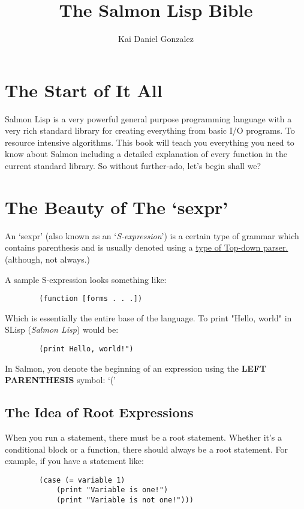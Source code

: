 \documentclass{article}
\title{The Salmon Lisp Bible}
\author{Kai Daniel Gonzalez}
\begin{document}
	\maketitle
	\tableofcontents
	\section{The Start of It All}
	Salmon Lisp is a very powerful general purpose programming language with a
	very rich standard library for creating everything from basic I/O programs. To resource intensive algorithms.
	\newline
	\newline
	This book will teach you everything you need to know about Salmon including a detailed explanation of every function in the current standard library. So without further-ado, let's begin shall we?
	\section{The Beauty of The `sexpr'}
	An `sexpr' (also known as an `\emph{S-expression}') is a certain type of grammar which
	contains parenthesis and is usually denoted using a \href{https://en.wikipedia.org/wiki/Top-down_parsing}{type of Top-down parser.} (although, not always.)
	
	A sample S-expression looks something like:

	\begin{lstlisting}
		(function [forms . . .])
	\end{lstlisting}

	Which is essentially the entire base of the language. To print "Hello, world" in SLisp (\emph{Salmon Lisp}) would be:
	
	\begin{lstlisting}
		(print Hello, world!")
	\end{lstlisting}

	In Salmon, you denote the beginning of an expression using the \textbf{LEFT PARENTHESIS} symbol: `('
	
	\subsection{The Idea of Root Expressions}
	When you run a statement, there must be a root statement. Whether it's a conditional block or a function, there should always be a root statement. For example, if you have a statement like:
	\begin{lstlisting}
		(case (= variable 1)
			(print "Variable is one!")
			(print "Variable is not one!")))
	\end{lstlisting}
\end{document}
